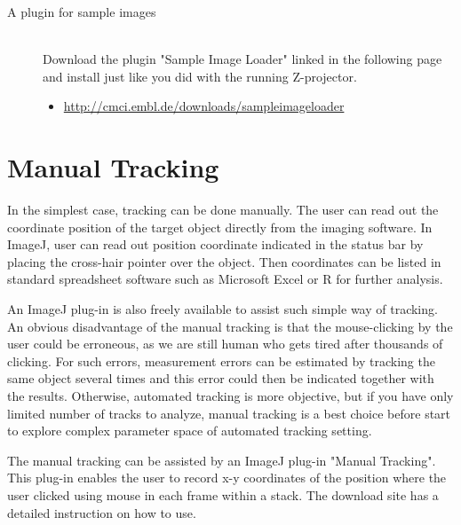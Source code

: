 \documentclass[11pnt]{article}
\begin{document}
\begin{description}
\item[A plugin for sample images]\hfill\\

Download the plugin "Sample Image Loader" linked in the following page and install just like you did with the running Z-projector. 
\begin{itemize}
\item\url{http://cmci.embl.de/downloads/sampleimageloader}
\end{itemize}

\end{description}

\section{Manual Tracking}

In the simplest case, tracking can be done manually. The user can read
out the coordinate position of the target object directly from the
imaging software. In ImageJ, user can read out position coordinate
indicated in the status bar by placing the cross-hair pointer over the
object. Then coordinates can be listed in standard spreadsheet software
such as Microsoft Excel or R for further analysis. 

An ImageJ plug-in is also freely available to assist such simple way of
tracking. An obvious disadvantage of the manual tracking is that the
mouse-clicking by the user could be erroneous, as we are still human
who gets tired after thousands of clicking. For such errors,
measurement errors can be estimated by tracking the same object several
times and this error could then be indicated together with the results.
Otherwise, automated tracking is more objective, but if you have only
limited number of tracks to analyze, manual tracking is a best choice
before start to explore complex parameter space of automated tracking
setting.

The manual tracking can be assisted by an ImageJ plug-in
"Manual Tracking". This plug-in
enables the user to record x-y coordinates of the position where the
user clicked using mouse in each frame within a stack. The download
site has a detailed instruction on how to use.  
\end{document}
